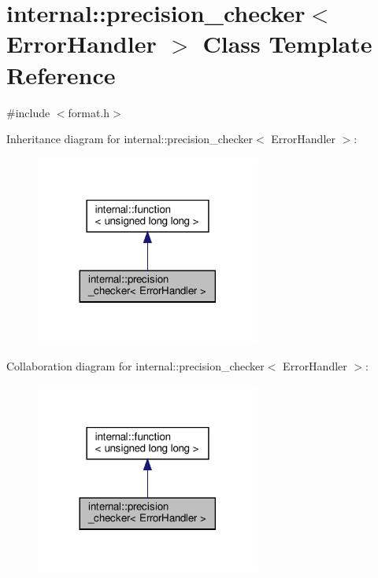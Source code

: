 \hypertarget{classinternal_1_1precision__checker}{}\section{internal\+:\+:precision\+\_\+checker$<$ Error\+Handler $>$ Class Template Reference}
\label{classinternal_1_1precision__checker}


{\ttfamily \#include $<$format.\+h$>$}



Inheritance diagram for internal\+:\+:precision\+\_\+checker$<$ Error\+Handler $>$\+:
\nopagebreak
\begin{figure}[H]
\begin{center}
\leavevmode
\includegraphics[width=209pt]{classinternal_1_1precision__checker__inherit__graph}
\end{center}
\end{figure}


Collaboration diagram for internal\+:\+:precision\+\_\+checker$<$ Error\+Handler $>$\+:
\nopagebreak
\begin{figure}[H]
\begin{center}
\leavevmode
\includegraphics[width=209pt]{classinternal_1_1precision__checker__coll__graph}
\end{center}
\end{figure}
